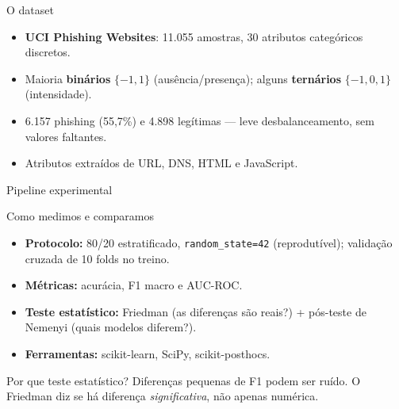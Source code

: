 \documentclass[aspectratio=169,12pt]{beamer}
\newcommand{\nTotal}{11.055}
\newcommand{\nFeatures}{30}
\newcommand{\nPhishing}{6.157}
\newcommand{\nLegitimo}{4.898}
\newcommand{\pctPhishing}{55,7\%}
\begin{document}
\begin{frame}{O dataset}
  \begin{itemize}
    \item \textbf{UCI Phishing Websites}: \nTotal{} amostras, \nFeatures{}
          atributos categóricos discretos.
    \item Maioria \textbf{binários} $\{-1,1\}$ (ausência/presença);
          alguns \textbf{ternários} $\{-1,0,1\}$ (intensidade).
    \item \nPhishing{} phishing (\pctPhishing) e \nLegitimo{} legítimas
          — leve desbalanceamento, sem valores faltantes.
    \item Atributos extraídos de URL, DNS, HTML e JavaScript.
  \end{itemize}
\end{frame}

\begin{frame}{Pipeline experimental}
  \centering
  \scriptsize
\end{frame}

\begin{frame}{Como medimos e comparamos}
  \begin{itemize}
    \item \textbf{Protocolo:} 80/20 estratificado, \texttt{random\_state=42}
          (reprodutível); validação cruzada de 10 folds no treino.
    \item \textbf{Métricas:} acurácia, F1 macro e AUC-ROC.
    \item \textbf{Teste estatístico:} Friedman (as diferenças são reais?)
          + pós-teste de Nemenyi (quais modelos diferem?).
    \item \textbf{Ferramentas:} scikit-learn, SciPy, scikit-posthocs.
  \end{itemize}
  \vfill
  \begin{block}{Por que teste estatístico?}
    Diferenças pequenas de F1 podem ser ruído. O Friedman diz se há diferença
    \emph{significativa}, não apenas numérica.
  \end{block}
\end{frame}
\end{document}

